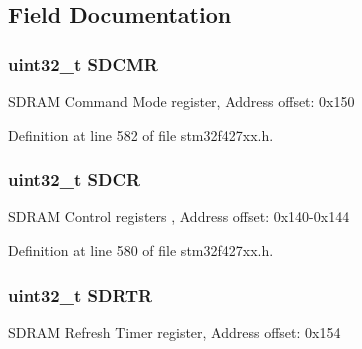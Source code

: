\subsection{Field Documentation}
\subsubsection[{\texorpdfstring{S\+D\+C\+MR}{SDCMR}}]{ uint32\+\_\+t S\+D\+C\+MR}\hypertarget{struct_f_m_c___bank5__6___type_def_a6722a71defead0b07cca1b79fab0fe88}{}\label{struct_f_m_c___bank5__6___type_def_a6722a71defead0b07cca1b79fab0fe88}
S\+D\+R\+AM Command Mode register, Address offset\+: 0x150 

Definition at line 582 of file stm32f427xx.\+h.

\subsubsection[{\texorpdfstring{S\+D\+CR}{SDCR}}]{ uint32\+\_\+t S\+D\+CR}\hypertarget{struct_f_m_c___bank5__6___type_def_ae9c0ece98f21a3b60aeb74b80fd96375}{}\label{struct_f_m_c___bank5__6___type_def_ae9c0ece98f21a3b60aeb74b80fd96375}
S\+D\+R\+AM Control registers , Address offset\+: 0x140-\/0x144 

Definition at line 580 of file stm32f427xx.\+h.

\subsubsection[{\texorpdfstring{S\+D\+R\+TR}{SDRTR}}]{ uint32\+\_\+t S\+D\+R\+TR}\hypertarget{struct_f_m_c___bank5__6___type_def_aed6d294188e6135964d6c3431c741fda}{}\label{struct_f_m_c___bank5__6___type_def_aed6d294188e6135964d6c3431c741fda}
S\+D\+R\+AM Refresh Timer register, Address offset\+: 0x154 


